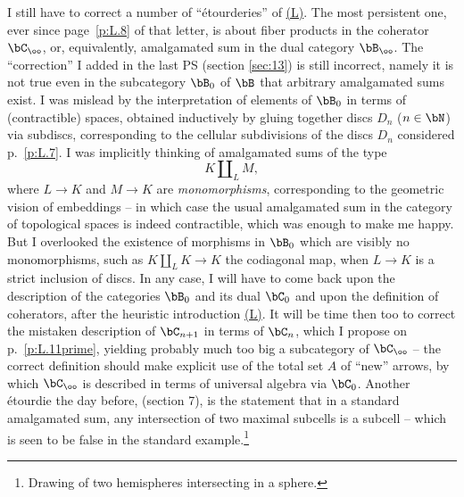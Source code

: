 \label{sec:18}%
I still have to correct a number of ``\'etourderies'' of
\hyperref[ch:I]{(L)}. The most persistent one, ever since page~\ref{p:L.8} of
that letter, is about fiber products in the coherator $\bC_\oo$, or,
equivalently, amalgamated sum in the dual category $\bB_\oo$. The
``correction'' I added in the last PS (section \ref{sec:13}) is
still incorrect, namely it is not true even in the subcategory $\bB_0$
of $\bB$ that arbitrary amalgamated sums exist. I was mislead by the
interpretation of elements of $\bB_0$ in terms of (contractible)
spaces, obtained inductively by gluing together discs $D_n$
($n\in\bN$) via subdiscs, corresponding to the cellular subdivisions
of the discs $D_n$ considered p.~\ref{p:L.7}. I was implicitly
thinking of amalgamated sums of the type
\[ K \amalg_L M,\]
where $L\to K$ and $M\to K$ are \emph{monomorphisms}, corresponding to
the geometric vision of embeddings -- in which case the usual
amalgamated sum in the category of topological spaces is indeed
contractible, which was enough to make me happy. But I overlooked the
existence of morphisms in $\bB_0$ which are visibly no
monomorphisms, such as $K \amalg_L K \to K$ the codiagonal map, when
$L \to K$ is a strict inclusion of discs. In any case, I will have to
come back upon the description of the categories $\bB_0$ and its
dual $\bC_0$ and upon the definition of coherators, after the
heuristic introduction \hyperref[ch:I]{(L)}. It will be time then too to correct the
mistaken description of $\bC_{n+1}$ in terms of $\bC_n$, which I
propose on p.~\ref{p:L.11prime}, yielding probably much too big a subcategory of
$\bC_\oo$ -- the correct definition should make explicit use of the
total set $A$ of ``new'' arrows, by which $\bC_\oo$ is described in
terms of universal algebra via $\bC_0$. Another \'etourdie the day
before, (section 7), is the statement that in a standard amalgamated sum,
any intersection of two maximal subcells is a subcell -- which is seen
to be false in the standard example.\footnote{Drawing of two
  hemispheres intersecting in a sphere.}

